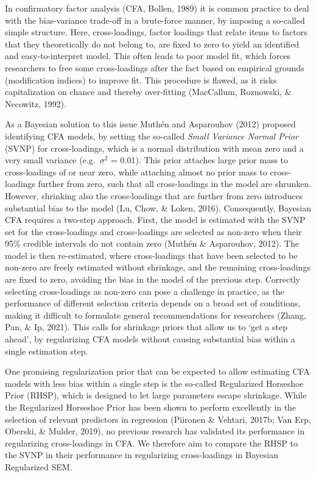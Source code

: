 \documentclass[
  man, donotrepeattitle,floatsintext]{apa6}
\begin{document}
In confirmatory factor analysis (CFA, Bollen, 1989) it is common practice to deal with the bias-variance trade-off in a brute-force manner, by imposing a so-called simple structure. Here, cross-loadings, factor loadings that relate items to factors that they
theoretically do not belong to, are fixed to zero to yield an identified and easy-to-interpret model. This often leads to poor model fit, which forces researchers to free some cross-loadings after the fact based on empirical grounds (modification indices) to improve fit. This procedure is flawed, as it risks capitalization on chance and thereby over-fitting (MacCallum, Roznowski, \& Necowitz, 1992).

As a Bayesian solution to this issue Muthén and Asparouhov (2012) proposed identifying CFA models, by setting the so-called \emph{Small Variance Normal Prior} (SVNP) for cross-loadings, which is a normal distribution with mean zero and a very small variance (e.g.~\(\sigma^2\) = 0.01). This prior attaches large prior mass to cross-loadings of or near zero, while attaching almost no prior mass to cross-loadings further from zero, such that all cross-loadings in the model are shrunken. However, shrinking also the cross-loadings that are further from zero introduces substantial bias to the model (Lu, Chow, \& Loken, 2016). Consequently, Bayesian CFA requires a two-step approach. First, the model is estimated with the SVNP set for the cross-loadings and cross-loadings are selected as non-zero when their 95\% credible intervals do not contain zero (Muthén \& Asparouhov, 2012). The model is then re-estimated, where cross-loadings that have been selected to be non-zero are freely estimated without shrinkage, and the remaining cross-loadings are fixed to zero, avoiding the bias in the model of the previous step. Correctly selecting cross-loadings as non-zero can pose a challenge in practice, as the performance of different selection criteria depends on a broad set of conditions, making it difficult to formulate general recommendations for researchers (Zhang, Pan, \& Ip, 2021). This calls for shrinkage priors that allow us to `get a step ahead', by regularizing CFA models without causing substantial bias within a single estimation step.

One promising regularization prior that can be expected to allow estimating CFA models with less bias within a single step is the so-called Regularized Horseshoe Prior (RHSP), which is designed to let large parameters escape shrinkage. While the Regularized Horseshoe Prior has been shown to perform excellently in the selection of relevant predictors in regression (Piironen \& Vehtari, 2017b; Van Erp, Oberski, \& Mulder, 2019), no previous research has validated its performance in regularizing cross-loadings in CFA. We therefore aim to compare the RHSP to the SVNP in their performance in regularizing cross-loadings in Bayesian Regularized SEM.
\end{document}
